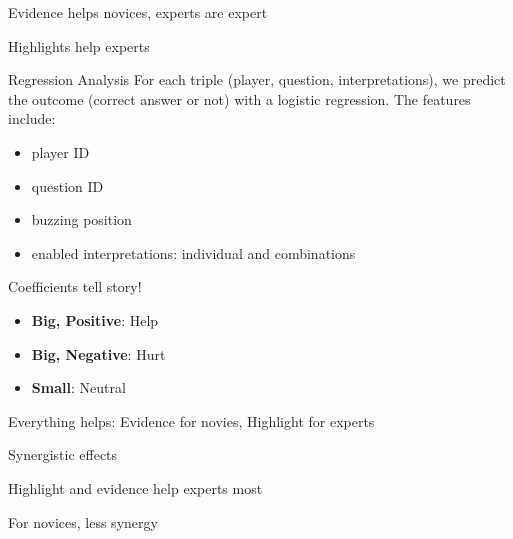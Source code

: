\documentclass[compress]{beamer}
\newcommand{\fsi}[2]{
\begin{frame}[plain]
\vspace*{-1pt}
\makebox[\linewidth]{\texttt{[image: \#1]}}
\begin{center}
#2
\end{center}
\end{frame}
}
\begin{document}
\fsi{qb/augment/tools_acc}{Evidence helps novices, experts are expert}
\fsi{qb/augment/tools_buzz}{Highlights help experts}

\begin{frame}{Regression Analysis}
    For each triple (player, question, interpretations), we predict the outcome
    (correct answer or not) with a logistic regression. The features include:
    \begin{itemize}
        \item player ID
        \item question ID
        \item buzzing position
        \item enabled interpretations: individual and combinations
    \end{itemize}

    \pause

    \begin{block}{Coefficients tell story!}
      \begin{itemize}
        \item {\bf Big, Positive}: Help
        \item {\bf Big, Negative}: Hurt
        \item {\bf Small}: Neutral
      \end{itemize}
    \end{block}

\end{frame}


\fsi{qb/augment/coefs_0}{Everything helps: Evidence for novies,
  Highlight for experts}
\fsi{qb/augment/coefs_1}{Synergistic effects}
\fsi{qb/augment/coefs_2}{Highlight and evidence help experts most}
\fsi{qb/augment/coefs_3}{For novices, less synergy}
\end{document}
